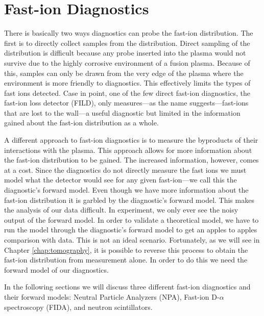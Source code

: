 \chapter{Fast-ion Diagnostics}\label{chap:diagnostics}
There is basically two ways diagnostics can probe the fast-ion distribution. The first is to directly collect samples from the distribution. Direct sampling of the distribution is difficult because any probe inserted into the plasma would not survive due to the highly corrosive environment of a fusion plasma. Because of this, samples can only be drawn from the very edge of the plasma where the environment is more friendly to diagnostics. This effectively limits the types of fast ions detected. Case in point, one of the few direct fast-ion diagnostics, the fast-ion loss detector (FILD), only measures---as the name suggests---fast-ions that are lost to the wall---a useful diagnostic but limited in the information gained about the fast-ion distribution as a whole.

A different approach to fast-ion diagnostics is to measure the byproducts of their interactions with the plasma. This approach allows for more information about the fast-ion distribution to be gained. The increased information, however, comes at a cost. Since the diagnostics do not directly measure the fast ions we must model what the detector would see for any given fast-ion---we call this the diagnostic's forward model. Even though we have more information about the fast-ion distribution it is garbled by the diagnostic's forward model. This makes the analysis of our data difficult. In experiment, we only ever see the noisy output of the forward model. In order to validate a theoretical model, we have to run the model through the diagnostic's forward model to get an apples to apples comparison with data. This is not an ideal scenario. Fortunately, as we will see in Chapter \ref{chap:tomography}, it is possible to reverse this process to obtain the fast-ion distribution from measurement alone. In order to do this we need the forward model of our diagnostics.

In the following sections we will discuss three different fast-ion diagnostics and their forward models: Neutral Particle Analyzers (NPA), Fast-ion D-$\alpha$ spectroscopy (FIDA), and neutron scintillators.

